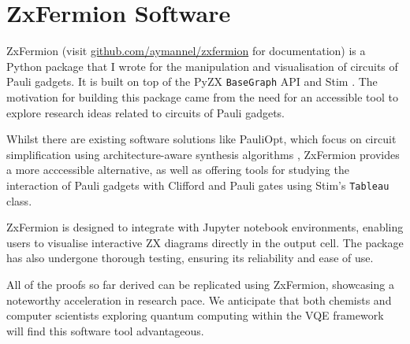 \chapter{ZxFermion Software}%
\label{zxfermion}

ZxFermion (visit \href{https://github.com/aymannel/zxfermion}{github.com/aymannel/zxfermion} for documentation) is a Python package that I wrote for the manipulation and visualisation of circuits of Pauli gadgets. It is built on top of the PyZX \lstinline{BaseGraph} API \cite{Kissinger2020} and Stim \cite{Gidney2021}. The motivation for building this package came from the need for an accessible tool to explore research ideas related to circuits of Pauli gadgets.

Whilst there are existing software solutions like PauliOpt, which focus on circuit simplification using architecture-aware synthesis algorithms \cite{Gogioso2023}, ZxFermion provides a more acccessible alternative, as well as offering tools for studying the interaction of Pauli gadgets with Clifford and Pauli gates using Stim's \lstinline{Tableau} class.

ZxFermion is designed to integrate with Jupyter notebook environments, enabling users to visualise interactive ZX diagrams directly in the output cell. The package has also undergone thorough testing, ensuring its reliability and ease of use.

All of the proofs so far derived can be replicated using ZxFermion, showcasing a noteworthy acceleration in research pace. We anticipate that both chemists and computer scientists exploring quantum computing within the VQE framework will find this software tool advantageous.

